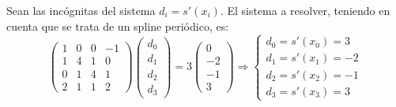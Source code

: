 \begin{ejercicio}
    Sean las incógnitas del sistema $d_i = s'(x_i)$. El sistema a resolver, teniendo en cuenta que se trata de un spline periódico, es:
    \begin{equation*}
        \left(\begin{array}{cccc}
            1 & 0 & 0 & -1\\
            1 & 4 & 1 & 0\\
            0 & 1 & 4 & 1 \\
            2 & 1 & 1 & 2
        \end{array}\right)
        \left(\begin{array}{ccc}
            d_0 \\ d_1 \\ d_2 \\ d_3
        \end{array}\right) =
        3\left(\begin{array}{ccc}
            0 \\ -2 \\ -1 \\ 3
        \end{array}\right) \Longrightarrow \left\{\begin{array}{l}
            d_0=s'(x_0)=3 \\ d_1=s'(x_1)=-2 \\ d_2=s'(x_2) = -1 \\ d_3=s'(x_3) = 3
        \end{array}\right.
    \end{equation*}


\end{ejercicio}
